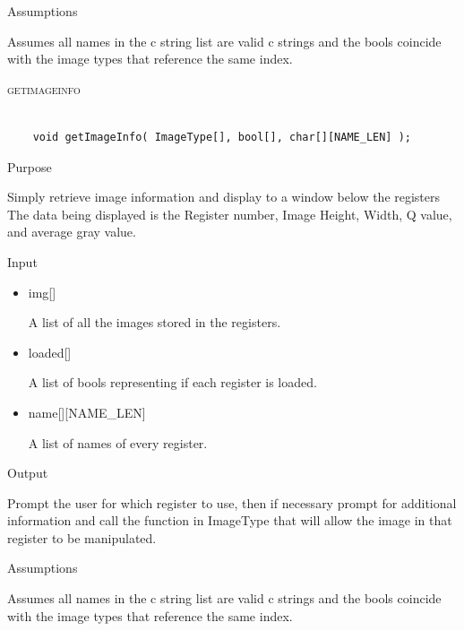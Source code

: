 \documentclass[pdftex, 11pt]{article}
\begin{document}
\begin{description}
\begin{description}
			\item{Assumptions}

				Assumes all names in the c string list are valid c
				strings and the bools coincide with the image types that
				reference the same index.

		\end{description}



	\item{\textsc{getimageinfo}}

		\begin{lstlisting}

	void getImageInfo( ImageType[], bool[], char[][NAME_LEN] );
		\end{lstlisting}

		\begin{description}
			\item{Purpose}

				Simply retrieve image information and display to a window below the registers
				The data being displayed is the Register number, Image Height, Width, Q value,
				and average gray value.

			\item{Input}

				\begin{itemize}

					\item{img[]}

						A list of all the images stored in the registers.

					\item{loaded[]}

						A list of bools representing if each register is loaded.

					\item{name[][NAME\_LEN]}

						A list of names of every register.

				\end{itemize}

			\item{Output}

				Prompt the user for which register to use, then if necessary
				prompt for additional information and call the function
				in ImageType that will allow the image in that register to
				be manipulated.

			\item{Assumptions}

				Assumes all names in the c string list are valid c
				strings and the bools coincide with the image types that
				reference the same index.


\end{description}
\end{description}
\end{document}
